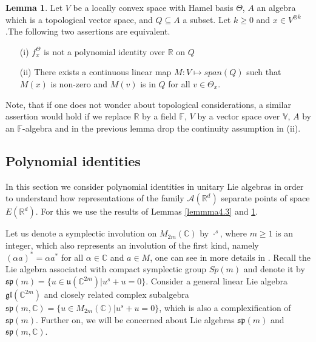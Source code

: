 \documentclass[12pt,a4paper]{report}
\theoremstyle{definition}
\newtheorem{lemma}{Lemma}
\begin{document}
\begin{lemma}\label{lemmma4.4}
	Let $V$ be a locally convex space with Hamel basis $\Theta$, $A$ an algebra which is a topological vector space, and $Q \subseteq A$ a subset. Let $k \geq 0$ and $x \in V^{\otimes k} $.The following two assertions are equivalent.
	\begin{enumerate}
	\item [(i)] $f_x^\Theta$	is not a polynomial identity over $\mathbb{R}$ on $Q$
	\item [(ii)]	There exists a continuous linear map $M : V \mapsto span(Q)$ such that $M(x)$ is non-zero and $M(v)$ is in $Q$ for all $v \in \Theta_x$.
	\end{enumerate}
\end{lemma}

Note, that if one does not wonder about topological considerations, a similar assertion would hold if we replace $\mathbb{R}$ by a field $\mathbb{F}$, $V$ by a vector space over $\mathbb{V}$, $A$ by an $\mathbb{F}$-algebra and in the previous lemma drop the continuity assumption in (ii).





\subsection{Polynomial identities}

In this section we consider polynomial identities in unitary Lie algebras in order to understand how representations of the family $\mathcal{A}(\mathbb{R}^d)$ separate points of space $E(\mathbb{R}^d)$. For this we use the results of Lemmas \ref{lemmma4.3} and \ref{lemmma4.4}.





Let us denote a symplectic involution on $M_{2m}(\mathbb{C})$ by $\cdot^s$, where $m\geq1$ is an integer, which also represents an involution of the first kind, namely $(\alpha a)^*=\alpha a^*$ for all $\alpha \in \mathbb{C}$ and $a \in M$, one can see in more details in \parencite{giambruno1995minimal}. Recall the Lie algebra associated with compact symplectic group $Sp(m)$ and denote it by $\mathfrak{sp}(m) = \{u \in \mathfrak{u}(\mathbb{C}^{2m}) | u^s + u = 0\}$. Consider a general linear Lie algebra $\mathfrak{gl}(\mathbb{C}^{2m})$ and closely related complex subalgebra $\mathfrak{sp}(m,\mathbb{C}) = \{u \in M_{2m}(\mathbb{C}) | u^s + u = 0\}$, which is also a complexification of $\mathfrak{sp}(m)$. Further on, we will be concerned about Lie algebras $\mathfrak{sp}(m)$ and $\mathfrak{sp}(m,\mathbb{C})$.
\end{document}
